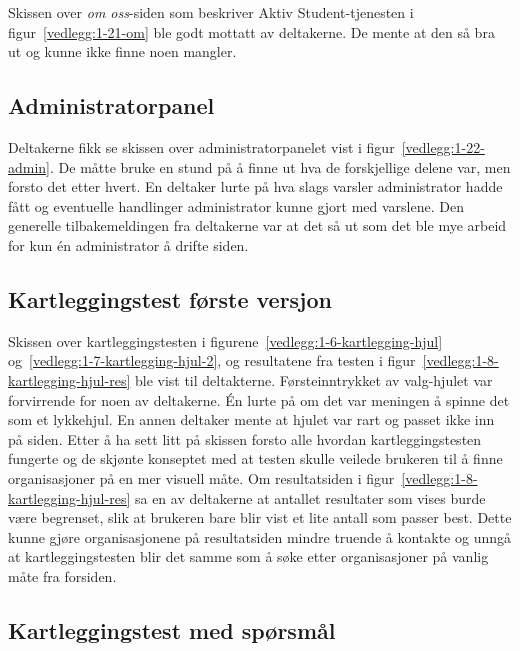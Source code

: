 Skissen over {\em om oss}-siden som beskriver Aktiv Student-tjenesten i figur~\ref{vedlegg:1-21-om} ble godt mottatt av deltakerne. De mente at den så bra ut og kunne ikke finne noen mangler.

\subsection{Administratorpanel}

Deltakerne fikk se skissen over administratorpanelet vist i figur~\ref{vedlegg:1-22-admin}. De måtte bruke en stund på å finne ut hva de forskjellige delene var, men forsto det etter hvert. En deltaker lurte på hva slags varsler administrator hadde fått og eventuelle handlinger administrator kunne gjort med varslene. Den generelle tilbakemeldingen fra deltakerne var at det så ut som det ble mye arbeid for kun én administrator å drifte siden.


\subsection{Kartleggingstest første versjon}
\label{section:test-kartlegging-hjul1.0}

Skissen over kartleggingstesten i figurene~\ref{vedlegg:1-6-kartlegging-hjul} og~\ref{vedlegg:1-7-kartlegging-hjul-2}, og resultatene fra testen i figur~\ref{vedlegg:1-8-kartlegging-hjul-res} ble vist til deltakterne. Førsteinntrykket av valg-hjulet var forvirrende for noen av deltakerne. Én lurte på om det var meningen å spinne det som et lykkehjul. En annen deltaker mente at hjulet var rart og passet ikke inn på siden. Etter å ha sett litt på skissen forsto alle hvordan kartleggingstesten fungerte og de skjønte konseptet med at testen skulle veilede brukeren til å finne organisasjoner på en mer visuell måte. Om resultatsiden i figur~\ref{vedlegg:1-8-kartlegging-hjul-res} sa en av deltakerne at antallet resultater som vises burde være begrenset, slik at brukeren bare blir vist et lite antall som passer best. Dette kunne gjøre organisasjonene på resultatsiden mindre truende å kontakte og unngå at kartleggingstesten blir det samme som å søke etter organisasjoner på vanlig måte fra forsiden.


\subsection{Kartleggingstest med spørsmål}
\label{section:test-kartlegging-spm1.0}

